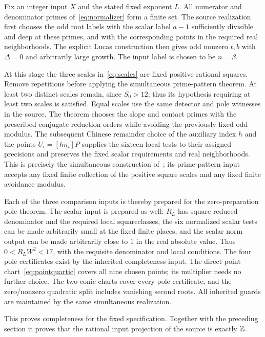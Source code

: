 \documentclass[11pt,a4paper]{article}
\begin{document}
Fix an integer input $X$ and the stated fixed exponent $L$. All numerator
and denominator primes of~\eqref{eq:normalizer} form a finite
set. The source realization first chooses the odd root labels
with the scalar label $a-1$ sufficiently divisible and deep at
these primes, and with the corresponding points in the required
real neighborhoods. The explicit Lucas construction then gives
odd nonzero $t,b$ with $\Delta=0$ and arbitrarily large
growth. The input label is chosen to be $n=\beta$.

At this stage the three scales in~\eqref{eq:scales} are fixed
positive rational squares. Remove repetitions before applying the
simultaneous prime-pattern theorem. At least two distinct scales
remain, since $S_0>12$; thus its hypothesis requiring at least two
scales is satisfied. Equal scales use the same detector and pole
witnesses in the source. The theorem chooses the slope
and contact primes with the prescribed conjugate reduction
orders while avoiding the previously fixed odd modulus. The
subsequent Chinese remainder choice of the auxiliary index $h$
and the points $U_i=[hn_i]P$ supplies the sixteen local tests
to their assigned precisions and preserves the fixed scalar
requirements and real neighborhoods. This is precisely the
simultaneous construction of~\cite{Dependencies,Baseline}; its
prime-pattern input accepts any fixed finite collection of the
positive square scales and any fixed finite avoidance modulus.

Each of the three comparison inputs is thereby prepared for the
zero-preparation pole theorem. The scalar input is prepared as
well: $R_L$ has square reduced denominator and the required
local squareclasses, the six normalized scalar tests can be made
arbitrarily small at the fixed finite places, and the scalar
norm output can be made arbitrarily close to $1$ in the real
absolute value. Thus $0<R_LW^2<17$, with the requisite
denominator and local conditions. The four pole certificates
exist by the inherited completeness input. The direct point chart~\eqref{eq:pointquartic} covers all nine
chosen points; its multiplier needs no further choice. The two conic charts
cover every pole certificate, and the zero/nonzero quadratic split
includes vanishing second roots. All inherited guards are
maintained by the same simultaneous realization.

This proves completeness for the fixed specification. Together with
the preceding section it proves that the rational input projection
of the source is exactly $\mathbb Z$.
\end{document}
